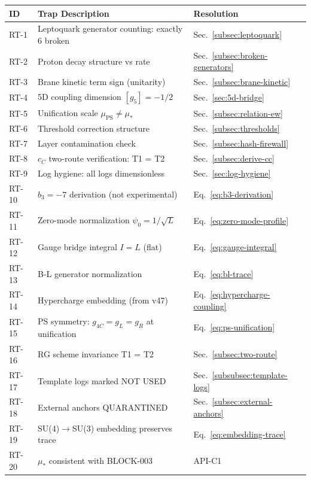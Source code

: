 \documentclass[11pt,a4paper]{article}
\theoremstyle{definition}
\begin{document}
\begin{trapbox}
\begin{center}
\begin{longtable}{lp{9cm}l}
\toprule
\textbf{ID} & \textbf{Trap Description} & \textbf{Resolution} \\
\midrule
\endhead
RT-1 & Leptoquark generator counting: exactly 6 broken & Sec.~\ref{subsec:leptoquark} \\
RT-2 & Proton decay structure vs rate & Sec.~\ref{subsec:broken-generators} \\
RT-3 & Brane kinetic term sign (unitarity) & Sec.~\ref{subsec:brane-kinetic} \\
RT-4 & 5D coupling dimension $[g_5] = -1/2$ & Sec.~\ref{sec:5d-bridge} \\
RT-5 & Unification scale $\mu_{\text{PS}} \neq \mu_*$ & Sec.~\ref{subsec:relation-ew} \\
RT-6 & Threshold correction structure & Sec.~\ref{subsec:thresholds} \\
RT-7 & Layer contamination check & Sec.~\ref{subsec:hash-firewall} \\
RT-8 & $c_C$ two-route verification: T1 = T2 & Sec.~\ref{subsec:derive-cc} \\
RT-9 & Log hygiene: all logs dimensionless & Sec.~\ref{sec:log-hygiene} \\
RT-10 & $b_3 = -7$ derivation (not experimental) & Eq.~\eqref{eq:b3-derivation} \\
RT-11 & Zero-mode normalization $\psi_0 = 1/\sqrt{L}$ & Eq.~\eqref{eq:zero-mode-profile} \\
RT-12 & Gauge bridge integral $I = L$ (flat) & Eq.~\eqref{eq:gauge-integral} \\
RT-13 & B-L generator normalization & Eq.~\eqref{eq:bl-trace} \\
RT-14 & Hypercharge embedding (from v47) & Eq.~\eqref{eq:hypercharge-coupling} \\
RT-15 & PS symmetry: $g_{4C} = g_L = g_R$ at unification & Eq.~\eqref{eq:ps-unification} \\
RT-16 & RG scheme invariance T1 = T2 & Sec.~\ref{subsec:two-route} \\
RT-17 & Template logs marked NOT USED & Sec.~\ref{subsubsec:template-logs} \\
RT-18 & External anchors QUARANTINED & Sec.~\ref{subsec:external-anchors} \\
RT-19 & SU(4)$\to$SU(3) embedding preserves trace & Eq.~\eqref{eq:embedding-trace} \\
RT-20 & $\mu_*$ consistent with BLOCK-003 & API-C1 \\
\bottomrule
\end{longtable}
\end{center}
\end{trapbox}
\end{document}
